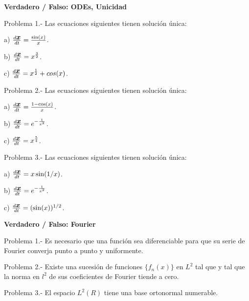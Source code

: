 \documentclass{article}
\newcommand{\ve}[1]{\mbox{\boldmath ${#1}$}}
\begin{document}
\newpage

\begin{center}
  \textbf{Verdadero / Falso: ODEs, Unicidad}
\end{center}
\vspace{1cm}

Problema 1.- Las ecuaciones siguientes tienen soluci\'on \'unica:

a) $\frac{d\ve{x}}{dt} = \frac{\sin(x)}{x}$.

b) $\frac{d\ve{x}}{dt} = x^{\frac{3}{2}}$.

c) $\frac{d\ve{x}}{dt} = x^{\frac{1}{2}} + cos(x)$.

Problema 2.- Las ecuaciones siguientes tienen soluci\'on \'unica:

a) $\frac{d\ve{x}}{dt} = \frac{1 - \cos(x)}{x}$.

b) $\frac{d\ve{x}}{dt} = e^{-\frac{1}{x^2}}$.

c) $\frac{d\ve{x}}{dt} = x^{\frac{5}{4}}$.


Problema 3.- Las ecuaciones siguientes tienen soluci\'on \'unica:

a) $\frac{d\ve{x}}{dt} = x\sin(1/x)$.

b) $\frac{d\ve{x}}{dt} = e^{-\frac{1}{x^2}}$.

c) $\frac{d\ve{x}}{dt} = (\sin(x))^{1/2}$.



\begin{center}
  \textbf{Verdadero / Falso: Fourier}
\end{center}

Problema 1.- Es necesario que una funci\'on sea diferenciable para que su
serie de Fourier converja punto a punto y uniformente.

Problema 2.- Existe una sucesi\'on de funciones $\{f_n(x)\}$ en $L^2$ tal 
que 
y tal que la norma en $l^2$ de sus coeficientes de
Fourier tiende a cero.

Problema 3.- El espacio $L^2(R)$ tiene una base ortonormal numerable.
\end{document}

